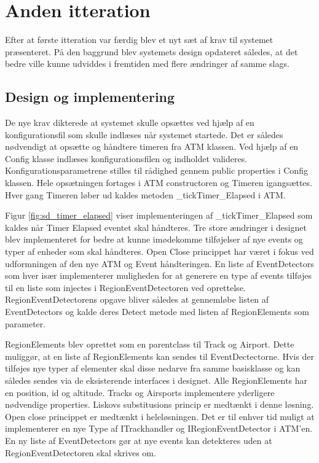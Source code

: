 \thispagestyle{fancy}
\chapter{Anden itteration}
\label{chp:seconditteration}
Efter at første itteration var færdig blev et nyt sæt af krav til systemet præsenteret. På den baggrund blev systemets design opdateret således, at det bedre ville kunne udviddes i fremtiden med flere ændringer af samme slags. 

\section{Design og implementering}
De nye krav dikterede at systemet skulle opsættes ved hjælp af en konfigurationsfil som skulle indlæses når systemet startede. Det er således nødvendigt at opsætte og håndtere timeren fra ATM klassen. Ved hjælp af en Config klasse indlæses konfigurationsfilen og indholdet valideres. Konfigurationsparametrene stilles til rådighed gennem public properties i Config klassen. Hele opsætningen fortages i ATM constructoren og Timeren igangsættes. Hver gang Timeren løber ud kaldes metoden \_tickTimer\_Elapsed i ATM. 


Figur \ref{fig:sd_timer_elapsed} viser implementeringen af \_tickTimer\_Elapsed som kaldes når Timer Elapsed eventet skal håndteres. Tre store ændringer i designet blev implementeret for bedre at kunne imødekomme tilføjelser af nye events og typer af enheder som skal håndteres. Open Close princippet har været i fokus ved udformningen af den nye ATM og Event håndteringen.
En liste af EventDetectors som hver især implementerer muligheden for at generere en type af events tilføjes til en liste som injectes i RegionEventDetectoren ved oprettelse. RegionEventDetectorens opgave bliver således at gennemløbe listen af EventDetectors og kalde deres Detect metode med listen af RegionElements som parameter.

RegionElements blev oprettet som en parentclass til Track og Airport. Dette muliggør, at en liste af RegionElements kan sendes til EventDectectorne. Hvis der tilføjes nye typer af elementer skal disse nedarve fra samme basisklasse og kan således sendes via de eksisterende interfaces i designet. Alle RegionElements har en position, id og altitude. Tracks og Airsports implementere yderligere nødvendige properties. Liskovs substitusions princip er medtænkt i denne løsning.
Open close princippet er medtænkt i heleløsningen. Det er til enhver tid muligt at implementerer en nye Type af ITrackhandler og IRegionEventDetector i ATM'en. En ny liste af EventDetectors gør at nye events kan detekteres uden at RegionEventDetectoren skal skrives om.

